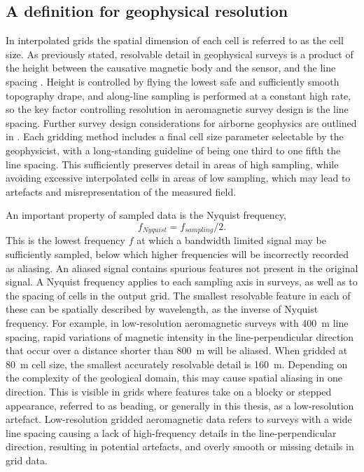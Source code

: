 \subsection{A definition for geophysical resolution}
In interpolated grids the spatial dimension of each cell is referred to as the cell size.
As previously stated, resolvable detail in geophysical surveys is a product of the height between the causative magnetic body and the sensor, and the line spacing \parencite{islesRelationshipsGeologicalResolution1992,islesGeologicalInterpretationAeromagnetic2013,dentithGeophysicsMineralExploration2014}.
Height is controlled by flying the lowest safe and sufficiently smooth topography drape, and along-line sampling is performed at a constant high rate, so the key factor controlling resolution in aeromagnetic survey design is the line spacing.
Further survey design considerations for airborne geophysics are outlined in \textcite{goodwinAirborneMagneticRadiometric2023,islesGeologicalInterpretationAeromagnetic2013,reidAeromagneticSurveyDesign1980}.
Each gridding method includes a final cell size parameter selectable by the geophysicist, with a long-standing guideline of being one third to one fifth the line spacing.
This sufficiently preserves detail in areas of high sampling, while avoiding excessive interpolated cells in areas of low sampling, which may lead to artefacts and misrepresentation of the measured field.

An important property of sampled data is the Nyquist frequency, \[f_{Nyquist} = f_{sampling} / 2.\]
This is the lowest frequency \(f\) at which a bandwidth limited signal may be sufficiently sampled, below which higher frequencies will be incorrectly recorded as aliasing.
An aliased signal contains spurious features not present in the original signal.
A Nyquist frequency applies to each sampling axis in surveys, as well as to the spacing of cells in the output grid.
The smallest resolvable feature in each of these can be spatially described by wavelength, as the inverse of Nyquist frequency.
For example, in low-resolution aeromagnetic surveys with \qty{400}{\m} line spacing, rapid variations of magnetic intensity in the line-perpendicular direction that occur over a distance shorter than \qty{800}{\m} will be aliased.
When gridded at \qty{80}{\m} cell size, the smallest accurately resolvable detail is \qty{160}{\m}.
Depending on the complexity of the geological domain, this may cause spatial aliasing in one direction.
This is visible in grids where features take on a blocky or stepped appearance, referred to as  beading, or generally in this thesis, as a low-resolution artefact.
Low-resolution gridded aeromagnetic data refers to surveys with a wide line spacing causing a lack of high-frequency details in the line-perpendicular direction, resulting in potential artefacts, and overly smooth or missing details in grid data.

